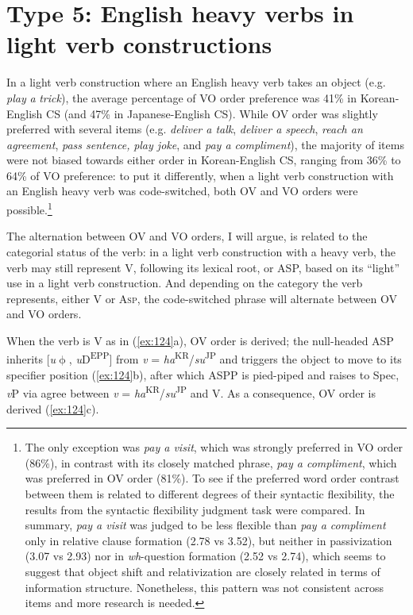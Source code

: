 \section{Type 5: English heavy verbs in light verb constructions}\label{ch5:sect:5.5}

In a light verb construction where an English heavy verb takes an object (e.g. \textit{play} \textit{a} \textit{trick}), the average percentage of \ac{VO} order preference was 41\% in Korean-English \ac{CS} (and 47\% in Japanese-English \ac{CS}). While \ac{OV} order was slightly preferred with several items (e.g. \textit{deliver a talk}, \textit{deliver a speech}, \textit{reach an agreement}, \textit{pass sentence,} \textit{play joke}, and \textit{pay a compliment}), the majority of items were not biased towards either order in Korean-English \ac{CS}, ranging from 36\% to 64\% of \ac{VO} preference: to put it differently, when a light verb construction with an English heavy verb was code-switched, both \ac{OV} and \ac{VO} orders were possible.\footnote{The only exception was \textit{pay a visit}, which was strongly preferred in \ac{VO} order (86\%), in contrast with its closely matched phrase, \textit{pay a compliment}, which was preferred in \ac{OV} order (81\%).  To see if the preferred word order contrast between them is related to different degrees of their syntactic flexibility, the results from the syntactic flexibility judgment task were compared. In summary, \textit{pay a visit} was judged to be less flexible than \textit{pay a compliment} only in relative clause formation (2.78 vs 3.52), but neither in passivization (3.07 vs 2.93) nor in \textit{wh}-question formation (2.52 vs 2.74), which seems to suggest that object shift and relativization are closely related in terms of information structure. Nonetheless, this pattern was not consistent across items and more research is needed.}

The alternation between \ac{OV} and \ac{VO} orders, I will argue, is related to the categorial status of the verb: in a light verb construction with a heavy verb, the verb may still represent V, following its lexical root, or \ac{ASP}, based on its “light” use in a light verb construction. And depending on the category the verb represents, either V or A\textsc{sp,} the code-switched phrase will alternate between \ac{OV} and \ac{VO} orders.

When the verb is V as in (\ref{ex:124}a), \ac{OV} order is derived; the null-headed \ac{ASP} inherits [\textit{u}$\upphi$, \textit{u}D\textsuperscript{EPP}] from \textit{v} = \textit{ha}\textsuperscript{\MakeUppercase{kr}}/\textit{su}\textsuperscript{\MakeUppercase{jp}}\MakeUppercase{} and triggers the object to move to its specifier position (\ref{ex:124}b), after which \ac{ASP}P is pied-piped and raises to Spec, \textit{v}P via agree between \textit{v} = \textit{ha}\textsuperscript{\MakeUppercase{kr}}/\textit{su}\textsuperscript{\MakeUppercase{jp}} and V. As a consequence, \ac{OV} order is derived (\ref{ex:124}c).

